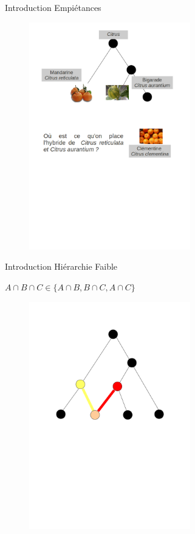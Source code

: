 \documentclass{beamer}
\begin{document}
  \begin{frame}{Introduction}
  \LARGE {\textrm{Empiétances}}
   \begin{figure}
	\includegraphics[width=7cm]{images/memoire_figure5.png} 
    \end{figure}
  \end{frame}


  \begin{frame}{Introduction}
  \LARGE {\textrm{Hiérarchie Faible}}

  $A \cap B \cap C\in \{A \cap B, B \cap C, A \cap C\}$
   \begin{figure}
	\includegraphics[width=7cm]{images/memoire_figure2.png} 
    \end{figure}
  \end{frame}
\end{document}
